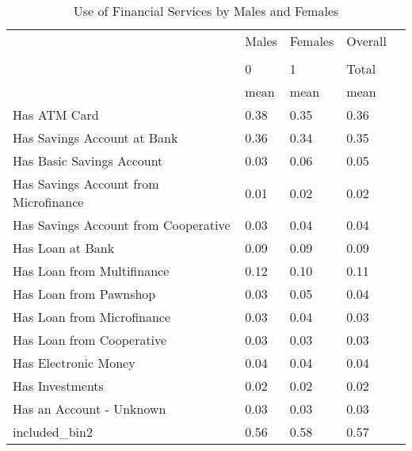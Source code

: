  \begin{table}[H] \begin{adjustbox}{max width=\textwidth} \begin{threeparttable} \caption{Use of Financial Services by Males and Females} \label{servgender} {\begin{tabular}{l*{1}{llll}} \hline  & Males & Females & Overall \\
                                                                                &\multicolumn{3}{c}{}         \\
                                                                                &        0&        1&    Total\\
                                                                                &     mean&     mean&     mean\\
\hline
Has ATM Card                                                                    &     0.38&     0.35&     0.36\\
Has Savings Account at Bank                                                     &     0.36&     0.34&     0.35\\
Has Basic Savings Account                                                       &     0.03&     0.06&     0.05\\
Has Savings Account from Microfinance                                           &     0.01&     0.02&     0.02\\
Has Savings Account from Cooperative                                            &     0.03&     0.04&     0.04\\
Has Loan at Bank                                                                &     0.09&     0.09&     0.09\\
Has Loan from Multifinance                                                      &     0.12&     0.10&     0.11\\
Has Loan from Pawnshop                                                          &     0.03&     0.05&     0.04\\
Has Loan from Microfinance                                                      &     0.03&     0.04&     0.03\\
Has Loan from Cooperative                                                       &     0.03&     0.03&     0.03\\
Has Electronic Money                                                            &     0.04&     0.04&     0.04\\
Has Investments                                                                 &     0.02&     0.02&     0.02\\
Has an Account - Unknown                                                        &     0.03&     0.03&     0.03\\
included\_bin2                                                                   &     0.56&     0.58&     0.57\\
\hline
\end{tabular}} \end{threeparttable} \end{adjustbox} \end{table} \vspace*{-5mm}
